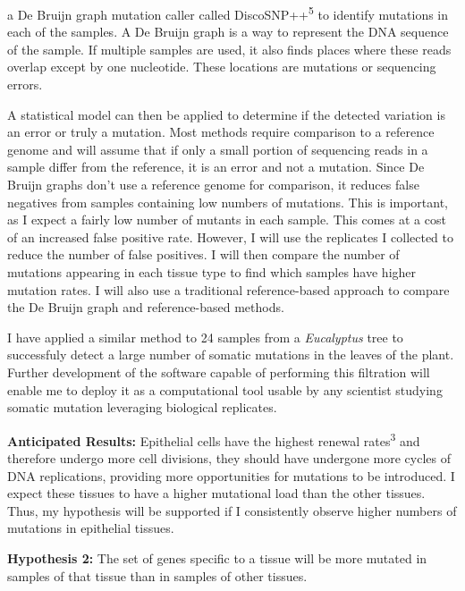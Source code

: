 \documentclass[12pt]{article}
\begin{document}
 a De Bruijn graph mutation caller called DiscoSNP++\textsuperscript{5} to identify mutations in each of the samples.
A De Bruijn graph is a way to represent the DNA sequence of the sample.
If multiple samples are used, it also finds places where these reads overlap except by one nucleotide.
These locations are mutations or sequencing errors.

A statistical model can then be applied to determine if the detected variation is an error or truly a mutation.
Most methods require comparison to a reference genome and will assume that if only a small portion of sequencing reads in a sample differ from the reference, it is an error and not a mutation.
Since De Bruijn graphs don't use a reference genome for comparison, it reduces false negatives from samples containing low numbers of mutations.
This is important, as I expect a fairly low number of mutants in each sample.
This comes at a cost of an increased false positive rate.
However, I will use the replicates I collected to reduce the number of false positives.
I will then compare the number of mutations appearing in each tissue type to find which samples have higher mutation rates.
I will also use a traditional reference-based approach to compare the De Bruijn graph and reference-based methods. %

I have applied a similar method to 24 samples from a \textit{Eucalyptus} tree to successfuly detect a large number of somatic mutations in the leaves of the plant. Further development of the software capable of performing this filtration will enable me to deploy it as a computational tool usable by any scientist studying somatic mutation leveraging biological replicates.

\textbf{Anticipated Results:}
Epithelial cells have the highest renewal rates\textsuperscript{3} and therefore undergo more cell divisions, they should have undergone more cycles of DNA replications, providing more opportunities for mutations to be introduced.
I expect these tissues to have a higher mutational load than the other tissues.
Thus, my hypothesis will be supported if I consistently observe higher numbers of mutations in epithelial tissues.

\textbf{Hypothesis 2:}
The set of genes specific to a tissue will be more mutated in samples of that tissue than in samples of other tissues.
\end{document}
